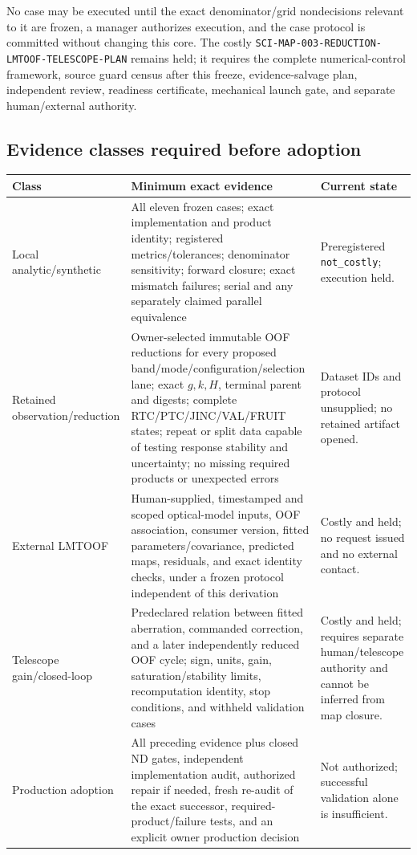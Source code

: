 \documentclass[11pt]{article}
\begin{document}
No case may be executed until the exact denominator/grid nondecisions relevant
to it are frozen, a manager authorizes execution, and the case protocol is
committed without changing this core.  The costly
\texttt{SCI-MAP-003-REDUCTION-LMTOOF-TELESCOPE-PLAN} remains held; it requires
the complete numerical-control framework, source guard census after this
freeze, evidence-salvage plan, independent review, readiness certificate,
mechanical launch gate, and separate human/external authority.

\subsection{Evidence classes required before adoption}

\begin{longtable}{@{}L{0.18\textwidth}L{0.36\textwidth}L{0.37\textwidth}@{}}
\toprule
Class & Minimum exact evidence & Current state \\
\midrule
\endhead
Local analytic/synthetic & All eleven frozen cases; exact implementation and
product identity; registered metrics/tolerances; denominator sensitivity;
forward closure; exact mismatch failures; serial and any separately claimed
parallel equivalence & Preregistered \texttt{not\_costly}; execution held. \\
Retained observation/reduction & Owner-selected immutable OOF reductions for
every proposed band/mode/configuration/selection lane; exact $g,k,H$, terminal
parent and digests; complete RTC/PTC/JINC/VAL/FRUIT states; repeat or split data
capable of testing response stability and uncertainty; no missing required
products or unexpected errors & Dataset IDs and protocol unsupplied; no
retained artifact opened. \\
External LMTOOF & Human-supplied, timestamped and scoped optical-model inputs,
OOF association, consumer version, fitted parameters/covariance, predicted
maps, residuals, and exact identity checks, under a frozen protocol independent
of this derivation & Costly and held; no request issued and no external contact. \\
Telescope gain/closed-loop & Predeclared relation between fitted aberration,
commanded correction, and a later independently reduced OOF cycle; sign,
units, gain, saturation/stability limits, recomputation identity, stop
conditions, and withheld validation cases & Costly and held; requires separate
human/telescope authority and cannot be inferred from map closure. \\
Production adoption & All preceding evidence plus closed ND gates, independent
implementation audit, authorized repair if needed, fresh re-audit of the exact
successor, required-product/failure tests, and an explicit owner production
decision & Not authorized; successful validation alone is insufficient. \\
\bottomrule
\end{longtable}
\end{document}
